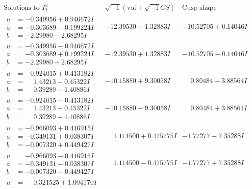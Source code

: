 \documentclass[1p]{elsarticle_modified}
\theoremstyle{definition}
\newcommand{\I}{\sqrt{-1}}
\begin{document}
$$\begin{array}{c|c|c}  
\text{Solutions to }I^u_{1}& \I (\text{vol} + \sqrt{-1}CS) & \text{Cusp shape}\\
 \hline 
\begin{aligned}
u &= -0.349956 + 0.946672 I \\
a &= -0.303689 - 0.199224 I \\
b &= -2.29980 - 2.68295 I\end{aligned}
 & -12.39530 - 1.32883 I & -10.52705 + 0.14046 I \\ \hline\begin{aligned}
u &= -0.349956 - 0.946672 I \\
a &= -0.303689 + 0.199224 I \\
b &= -2.29980 + 2.68295 I\end{aligned}
 & -12.39530 + 1.32883 I & -10.52705 - 0.14046 I \\ \hline\begin{aligned}
u &= -0.924015 + 0.413182 I \\
a &= \phantom{-}1.43213 - 0.45322 I \\
b &= \phantom{-}0.39289 - 1.40886 I\end{aligned}
 & -10.15880 + 9.30058 I & \phantom{-}0.80484 - 3.88564 I \\ \hline\begin{aligned}
u &= -0.924015 - 0.413182 I \\
a &= \phantom{-}1.43213 + 0.45322 I \\
b &= \phantom{-}0.39289 + 1.40886 I\end{aligned}
 & -10.15880 - 9.30058 I & \phantom{-}0.80484 + 3.88564 I \\ \hline\begin{aligned}
u &= -0.966093 + 0.416915 I \\
a &= -0.349131 + 0.038307 I \\
b &= -0.007320 + 0.449427 I\end{aligned}
 & \phantom{-}1.114500 + 0.475775 I & -1.77277 - 7.35288 I \\ \hline\begin{aligned}
u &= -0.966093 - 0.416915 I \\
a &= -0.349131 - 0.038307 I \\
b &= -0.007320 - 0.449427 I\end{aligned}
 & \phantom{-}1.114500 - 0.475775 I & -1.77277 + 7.35288 I \\ \hline\begin{aligned}
u &= \phantom{-}0.321525 + 1.004170 I \\

\end{aligned}
\end{array}$$
\end{document}
